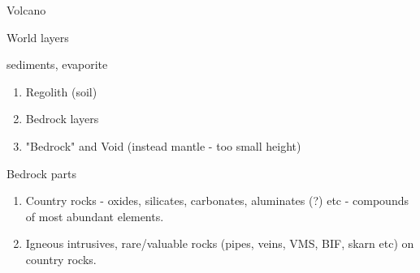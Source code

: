 \documentclass[12pt]{article}
\begin{document}
    Volcano


    World layers

    sediments, evaporite

    \begin{enumerate}
        \item Regolith (soil)
        \item Bedrock layers
        \item "Bedrock" and Void (instead mantle - too small height)
    \end{enumerate}

    Bedrock parts

    \begin{enumerate}
        \item Country rocks - oxides, silicates, carbonates, aluminates (?) etc - compounds of most abundant elements.
        \item Igneous intrusives, rare/valuable rocks (pipes, veins, VMS, BIF, skarn etc) on country rocks.
    \end{enumerate}
\end{document}
